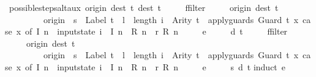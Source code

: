 \begin{isabellebody}
\isanewline
{}\isamarkupfalse%
\ possible{\isacharunderscore}steps{\isacharunderscore}alt{\isacharunderscore}aux{\isacharcolon}\ {\isachardoublequoteopen}{\isacharparenleft}{\isasymlambda}{\isacharparenleft}{\isacharparenleft}origin{\isacharcomma}\ dest{\isacharparenright}{\isacharcomma}\ t{\isacharparenright}{\isachardot}\ {\isacharparenleft}dest{\isacharcomma}\ t{\isacharparenright}{\isacharparenright}\ {\isacharbar}{\isacharbackquote}{\isacharbar}\isanewline
\ \ \ \ ffilter\isanewline
\ \ \ \ \ {\isacharparenleft}{\isasymlambda}{\isacharparenleft}{\isacharparenleft}origin{\isacharcomma}\ dest{\isacharparenright}{\isacharcomma}\ t{\isacharparenright}{\isachardot}\isanewline
\ \ \ \ \ \ \ \ \ origin\ {\isacharequal}\ s\ {\isasymand}\ Label\ t\ {\isacharequal}\ l\ {\isasymand}\ length\ i\ {\isacharequal}\ Arity\ t\ {\isasymand}\ apply{\isacharunderscore}guards\ {\isacharparenleft}Guard\ t{\isacharparenright}\ {\isacharparenleft}{\isasymlambda}x{\isachardot}\ case\ x\ of\ I\ n\ {\isasymRightarrow}\ input{}state\ i\ {}\ {\isacharparenleft}I\ n{\isacharparenright}\ {\isacharbar}\ R\ n\ {\isasymRightarrow}\ r\ {\isacharparenleft}R\ n{\isacharparenright}{\isacharparenright}{\isacharparenright}\isanewline
\ \ \ \ \ e\ {\isacharequal}\isanewline
\ \ \ \ {\isacharbraceleft}{\isacharbar}{\isacharparenleft}d{\isacharcomma}\ t{\isacharparenright}{\isacharbar}{\isacharbraceright}\ {\isasymLongrightarrow}\isanewline
\ \ \ \ ffilter\isanewline
\ \ \ \ \ {\isacharparenleft}{\isasymlambda}{\isacharparenleft}{\isacharparenleft}origin{\isacharcomma}\ dest{\isacharparenright}{\isacharcomma}\ t{\isacharparenright}{\isachardot}\isanewline
\ \ \ \ \ \ \ \ \ origin\ {\isacharequal}\ s\ {\isasymand}\ Label\ t\ {\isacharequal}\ l\ {\isasymand}\ length\ i\ {\isacharequal}\ Arity\ t\ {\isasymand}\ apply{\isacharunderscore}guards\ {\isacharparenleft}Guard\ t{\isacharparenright}\ {\isacharparenleft}{\isasymlambda}x{\isachardot}\ case\ x\ of\ I\ n\ {\isasymRightarrow}\ input{}state\ i\ {}\ {\isacharparenleft}I\ n{\isacharparenright}\ {\isacharbar}\ R\ n\ {\isasymRightarrow}\ r\ {\isacharparenleft}R\ n{\isacharparenright}{\isacharparenright}{\isacharparenright}\isanewline
\ \ \ \ \ e\ {\isacharequal}\isanewline
\ \ \ \ {\isacharbraceleft}{\isacharbar}{\isacharparenleft}{\isacharparenleft}s{\isacharcomma}\ d{\isacharparenright}{\isacharcomma}\ t{\isacharparenright}{\isacharbar}{\isacharbraceright}{\isachardoublequoteclose}\isanewline
%
\isadelimproof
%
\endisadelimproof
%
\isatagproof
{}\isamarkupfalse%
{\isacharparenleft}induct\ e{\isacharparenright}\isanewline

\end{isabellebody}
